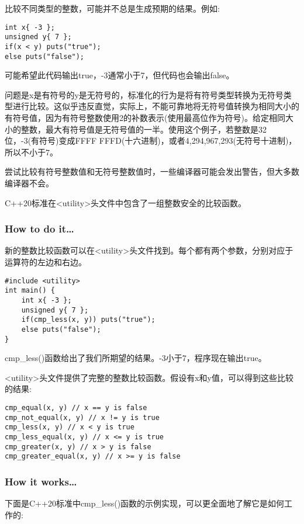
比较不同类型的整数，可能并不总是生成预期的结果。例如:

\begin{lstlisting}[style=styleCXX]
int x{ -3 };
unsigned y{ 7 };
if(x < y) puts("true");
else puts("false");
\end{lstlisting}

可能希望此代码输出true，-3通常小于7，但代码也会输出false。

问题是x是有符号的y是无符号的，标准化的行为是将有符号类型转换为无符号类型进行比较。这似乎违反直觉，实际上，不能可靠地将无符号值转换为相同大小的有符号值，因为有符号整数使用2的补数表示(使用最高位作为符号)。给定相同大小的整数，最大有符号值是无符号值的一半。使用这个例子，若整数是32位，-3(有符号)变成FFFF FFFD(十六进制)，或者4,294,967,293(无符号十进制)，所以不小于7。

尝试比较有符号整数值和无符号整数值时，一些编译器可能会发出警告，但大多数编译器不会。

C++20标准在<utility>头文件中包含了一组整数安全的比较函数。

\subsubsection{How to do it…}

新的整数比较函数可以在<utility>头文件找到。每个都有两个参数，分别对应于运算符的左边和右边。

\begin{lstlisting}[style=styleCXX]
#include <utility>
int main() {
	int x{ -3 };
	unsigned y{ 7 };
	if(cmp_less(x, y)) puts("true");
	else puts("false");
}
\end{lstlisting}

cmp\_less()函数给出了我们所期望的结果。-3小于7，程序现在输出true。

<utility>头文件提供了完整的整数比较函数。假设有x和y值，可以得到这些比较的结果:

\begin{lstlisting}[style=styleCXX]
cmp_equal(x, y) // x == y is false
cmp_not_equal(x, y) // x != y is true
cmp_less(x, y) // x < y is true
cmp_less_equal(x, y) // x <= y is true
cmp_greater(x, y) // x > y is false
cmp_greater_equal(x, y) // x >= y is false
\end{lstlisting}

\subsubsection{How it works…}

下面是C++20标准中cmp\_less()函数的示例实现，可以更全面地了解它是如何工作的:

